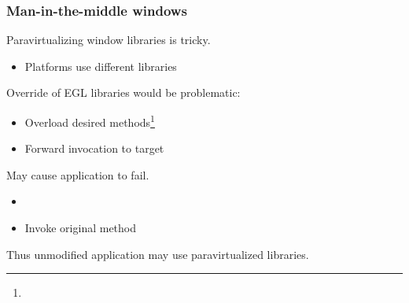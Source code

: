 \begin{frame}
\frametitle{Man-in-the-middle windows}

Paravirtualizing window libraries is tricky.
\begin{itemize}
	\item Platforms use different libraries
\end{itemize}

Override of EGL libraries would be problematic:
\begin{itemize}
	\item Overload desired methods\footnote{}
	\item Forward invocation to target
\end{itemize}

May cause application to fail.
\begin{itemize}
	\item {}
	\item Invoke original method
\end{itemize}

Thus unmodified application may use paravirtualized libraries.

\end{frame}

